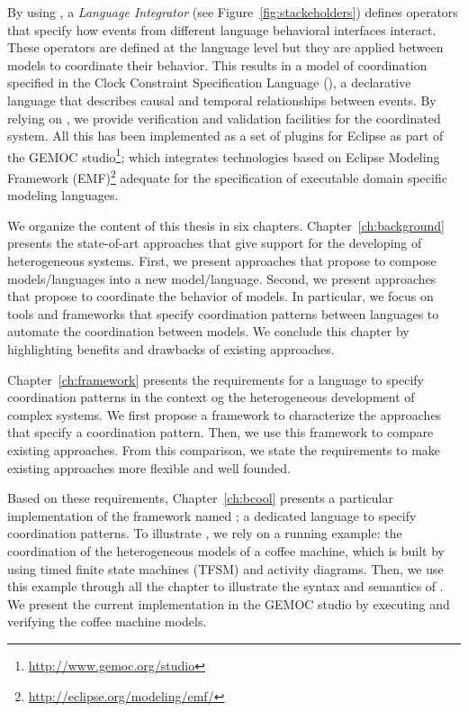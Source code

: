 By using \bcool, a \emph{Language Integrator} (see Figure~\ref{fig:stackeholders}) defines operators that specify how events from different language behavioral interfaces interact. These operators are defined at the language level but they are applied between models to coordinate their behavior. This results in a model of coordination specified in the Clock Constraint Specification Language (\ccsl), a declarative language that describes causal and temporal relationships between events. By relying on \ccsl, we provide verification and validation facilities for the coordinated system. All this has been implemented as a set of plugins for Eclipse as part of the GEMOC studio\footnote{\url{http://www.gemoc.org/studio}}; which integrates technologies based on Eclipse Modeling Framework (EMF)\footnote{\url{http://eclipse.org/modeling/emf/}} adequate for the specification of executable domain specific modeling languages. %

We organize the content of this thesis in six chapters. Chapter~\ref{ch:background} presents the state-of-art approaches that give support for the developing of heterogeneous systems. First, we present approaches that propose to compose models/languages into a new model/language. Second, we present approaches that propose to coordinate the behavior of models. In particular, we focus on tools and frameworks that specify coordination patterns between languages to automate the coordination between models. We conclude this chapter by highlighting benefits and drawbacks of existing approaches.     
 
Chapter~\ref{ch:framework} presents the requirements for a language to specify coordination patterns in the context og the heterogeneous development of complex systems. We first propose a framework to characterize the approaches that specify a coordination pattern. Then, we use this framework to compare existing approaches. From this comparison, we state the requirements to make existing approaches more flexible and well founded. 

Based on these requirements, Chapter~\ref{ch:bcool} presents a particular implementation of the framework named \bcool; a dedicated language to specify coordination patterns. To illustrate \bcool, we rely on a running example: the coordination of the heterogeneous models of a coffee machine, which is built by using timed finite state machines (TFSM) and activity diagrams. Then, we use this example through all the chapter to illustrate the syntax and semantics of \bcool. We present the current implementation in the GEMOC studio by executing and verifying the coffee machine models. 

